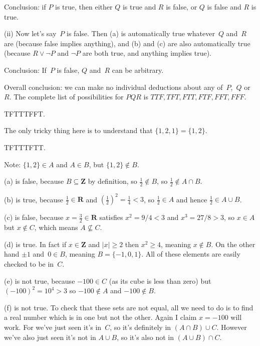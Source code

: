 \documentclass[10pt]{article}
\newcommand{\R}{\mathbf{R}}
\newcommand{\Z}{\mathbf{Z}}
\begin{document}
Conclusion: if $P$ is true, then either $Q$ is true and $R$ is false, or $Q$ is false and $R$ is true.

(ii) Now let's say~$P$ is false. Then (a) is automatically true whatever~$Q$ and~$R$ are (because false implies anything), and (b) and (c) are also automatically true (because $R\vee\neg P$ and $\neg P$ are both true, and anything implies true).

Conclusion: If~$P$ is false, $Q$ and~$R$ can be arbitrary.

Overall conclusion: we can make no individual deductions about any of~$P$,~$Q$ or~$R$. The complete list of possibilities for $PQR$ is $TTF,TFT,FTT,FTF,FFT,FFF$.

\medskip{} TFTTTFFT.

The only tricky thing here is to understand that $\{1,2,1\}=\{1,2\}$.

\medskip
{} TFTTTFTT.

Note: $\{1,2\}\in A$ and $A\in B$, but $\{1,2\}\not\in B$.

\medskip{}

(a) is false, because $B\subseteq\Z$ by definition, so $\frac{1}{2}\not\in B$, so $\frac{1}{2}\not\in A\cap B$.

(b) is true, because $\frac12\in\R$ and $\left(\frac12\right)^2=\frac14<3$, so $\frac12\in A$ and hence $\frac12\in A\cup B$.

(c) is false, because $x=\frac32\in\R$ satisfies $x^2=9/4<3$ and $x^3=27/8>3$, so $x\in A$ but $x\not\in C$, which means $A\not\subseteq C$.

(d) is true. In fact if $x\in\Z$ and $|x|\geq2$ then $x^2\geq4$, meaning $x\not\in B$. On the other hand $\pm1$ and~$0\in B$, meaning $B=\{-1,0,1\}$. All of these elements are easily checked to be in~$C$.

(e) is not true, because $-100\in C$ (as its cube is less than zero) but $(-100)^2=10^4>3$ so $-100\not\in A$ and $-100\not\in B$.

(f) is not true. To check that these sets are not equal, all we need to do is to find a real number which is in one but not the other. Again I claim $x=-100$ will work. For we've just seen it's in~$C$, so it's definitely in $(A\cap B)\cup C$. However we've also just seen it's not in $A\cup B$, so it's also not in $(A\cup B)\cap C$.
\end{document}
